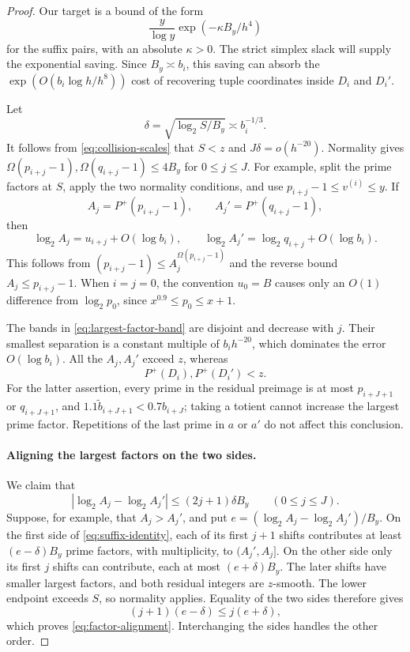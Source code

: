 \begin{proof}
Our target is a bound of the form
\[
 \frac{y}{\log y}\exp(-\kappa B_y/h^4)
\]
for the suffix pairs, with an absolute $\kappa>0$.
The strict simplex slack will supply the exponential saving.
Since $B_y\asymp b_i$, this saving can absorb the
$\exp(O(b_i\log h/h^8))$ cost of recovering tuple coordinates
inside $D_i$ and $D_i'$.

Let
\[
 \delta=\sqrt{\log_2S/B_y}\asymp b_i^{-1/3}.
\]
It follows from \eqref{eq:collision-scales} that $S<z$ and
$J\delta=o(h^{-20})$.  Normality gives
$\Omega(p_{i+j}-1),\Omega(q_{i+j}-1)\le4B_y$ for $0\le j\le J$.
For example, split the prime factors at $S$, apply the two normality
conditions, and use $p_{i+j}-1\le v^{(i)}\le y$.  If
\[
 A_j=P^+(p_{i+j}-1),\qquad A_j'=P^+(q_{i+j}-1),
\]
then
\begin{equation}\label{eq:largest-factor-band}
 \log_2A_j=u_{i+j}+O(\log b_i),\qquad
 \log_2A_j'=\log_2q_{i+j}+O(\log b_i).
\end{equation}
This follows from
$(p_{i+j}-1)\le A_j^{\Omega(p_{i+j}-1)}$ and the reverse bound
$A_j\le p_{i+j}-1$.  When $i=j=0$, the convention $u_0=B$
causes only an $O(1)$ difference from $\log_2p_0$, since
$x^{0.9}\le p_0\le x+1$.

The bands in \eqref{eq:largest-factor-band} are disjoint and decrease
with $j$.  Their smallest separation is a constant multiple of
$b_i h^{-20}$, which dominates the error $O(\log b_i)$.  All the $A_j,A_j'$
exceed $z$, whereas
\[
 P^+(D_i),P^+(D_i')<z.
\]
For the latter assertion, every prime in the residual preimage is at
most $p_{i+J+1}$ or $q_{i+J+1}$, and
$1.1\widetilde b_{i+J+1}<0.7b_{i+J}$; taking a totient cannot increase
the largest prime factor.  Repetitions of the last prime in $a$ or $a'$
do not affect this conclusion.

\paragraph{Aligning the largest factors on the two sides.}
We claim that
\begin{equation}\label{eq:factor-alignment}
 |\log_2 A_j-\log_2 A_j'|\le(2j+1)\delta B_y
                 \qquad(0\le j\le J).
\end{equation}
Suppose, for example, that $A_j>A_j'$, and put
$e=(\log_2 A_j-\log_2 A_j')/B_y$.  On the first side of
\eqref{eq:suffix-identity}, each of its first $j+1$ shifts contributes
at least $(e-\delta)B_y$ prime factors, with multiplicity, to
$(A_j',A_j]$.  On the other side only its first $j$ shifts can
contribute, each at most $(e+\delta)B_y$.  The later shifts have smaller
largest factors, and both residual integers are $z$-smooth.  The lower
endpoint exceeds $S$, so normality applies.  Equality of the two sides
therefore gives
\[
 (j+1)(e-\delta)\le j(e+\delta),
\]
which proves \eqref{eq:factor-alignment}.  Interchanging the sides
handles the other order.


\end{proof}
